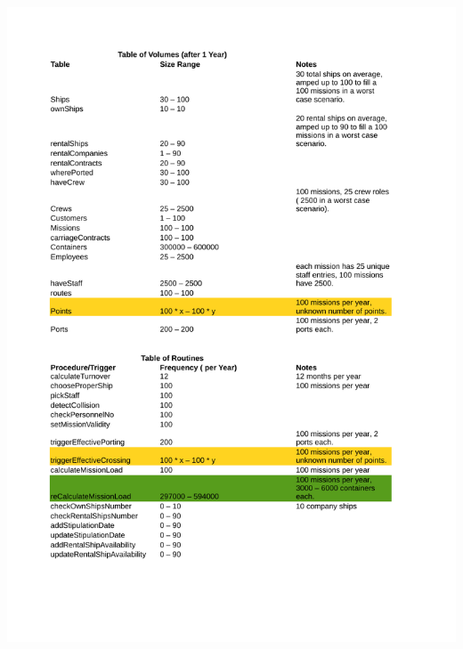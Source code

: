 \documentclass[10pt]{report}
\begin{document}
\begin{center}
	\includegraphics[trim=1cm 3cm 2cm 0cm,clip=true, height=.85\textheight, width=\textwidth]{Volumes.pdf}
\end{center}
\newpage
\end{document}
